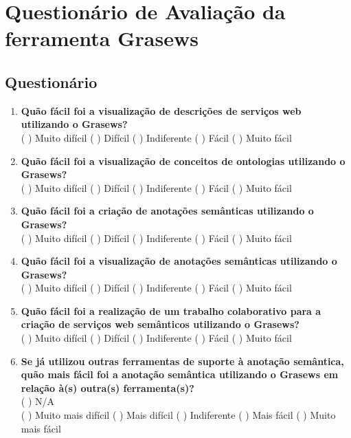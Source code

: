 \chapter{Questionário de Avaliação da ferramenta Grasews}\label{apendice-questionario-grasews}

\section{Questionário}

\begin{enumerate}[label=Q\arabic*]

    \item
    \textbf{Quão fácil foi a visualização de descrições de serviços web utilizando o Grasews?}
    \\
    ( ) Muito difícil ( ) Difícil ( ) Indiferente ( ) Fácil ( ) Muito fácil
    
    \item
    \textbf{Quão fácil foi a visualização de conceitos de ontologias utilizando o Grasews?}
    \\
    ( ) Muito difícil ( ) Difícil ( ) Indiferente ( ) Fácil ( ) Muito fácil

    \item
    \textbf{Quão fácil foi a criação de anotações semânticas utilizando o Grasews?}
    \\
    ( ) Muito difícil ( ) Difícil ( ) Indiferente ( ) Fácil ( ) Muito fácil

    \item
    \textbf{Quão fácil foi a visualização de anotações semânticas utilizando o Grasews?}
    \\
    ( ) Muito difícil ( ) Difícil ( ) Indiferente ( ) Fácil ( ) Muito fácil

    \item
    \textbf{Quão fácil foi a realização de um trabalho colaborativo para a criação de serviços web semânticos utilizando o Grasews?}
    \\
    ( ) Muito difícil ( ) Difícil ( ) Indiferente ( ) Fácil ( ) Muito fácil
    
    \item
    \textbf{Se já utilizou outras ferramentas de suporte à anotação semântica, quão mais fácil foi a anotação semântica utilizando o Grasews em relação à(s) outra(s) ferramenta(s)?}
    \\
    ( ) N/A
    \\
    ( ) Muito mais difícil ( ) Mais difícil ( ) Indiferente ( ) Mais fácil ( ) Muito mais fácil
    

\end{enumerate}
